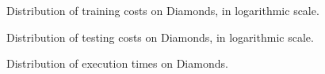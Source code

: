 \begin{figure}[h!]
	\centering
	\scalebox{0.7}{}
	\caption{Distribution of training costs on Diamonds, in logarithmic scale.}
	\label{Diamonds_train}
\end{figure}

\begin{figure}[h!]
	\centering
	\scalebox{0.7}{}
	\caption{Distribution of testing costs on Diamonds, in logarithmic scale.}
	\label{Diamonds_test}
\end{figure}

\begin{figure}[h!]
	\centering
	\scalebox{0.7}{}
	\caption{Distribution of execution times on Diamonds.}
	\label{Diamonds_time}
\end{figure}


